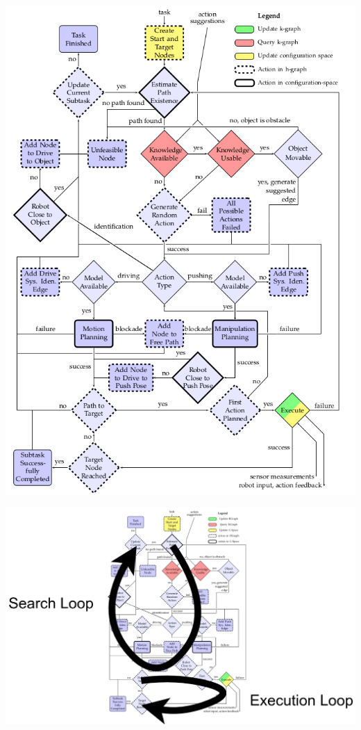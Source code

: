 \begin{frame}[fragile]{}
  \begin{center}
    \includegraphics[height=0.95\textheight]{figures/proposed_method/tikz_flowchart_halgorithm}
  \end{center}
\end{frame}

\begin{frame}[fragile]{} 
  \begin{center}
    \includegraphics[height=0.98\textheight]{figures/proposed_method/two_loops_identified}
  \end{center}
\end{frame}


